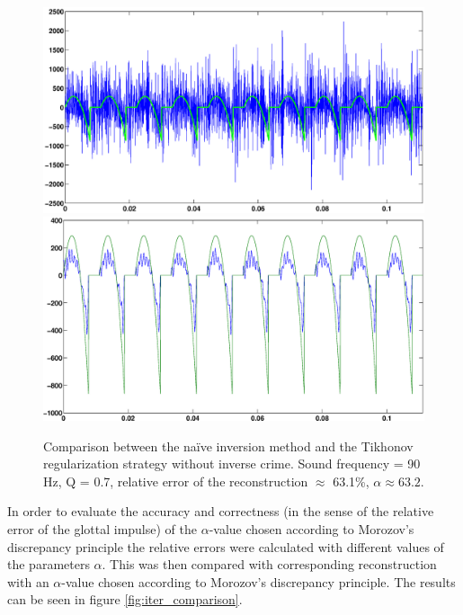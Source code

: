 \documentclass[12pt,a4]{article}
\begin{document}
\begin{figure}[H]
\begin{center}
\includegraphics[scale=.3]{img/naive_test_naive[V3].eps}
\includegraphics[scale=.3]{img/naive_test_morozov[V3].eps}
\end{center}
\caption{Comparison between the naïve inversion method and the Tikhonov regularization strategy without inverse crime. Sound frequency = 90 Hz, Q = 0.7, relative error of the reconstruction $\approx$ 63.1\%, $\alpha \approx 63.2$.}
\label{fig:naive-comparison_nocrime}
\end{figure}
In order to evaluate the accuracy and correctness (in the sense of the relative error of the glottal impulse) of the $\alpha$-value chosen according to Morozov's discrepancy principle the relative errors were calculated with different values of the parameters $\alpha$. This was then compared with corresponding reconstruction with an $\alpha$-value chosen according to Morozov's discrepancy principle. The results can be seen in figure \ref{fig:iter_comparison}.
\end{document}
